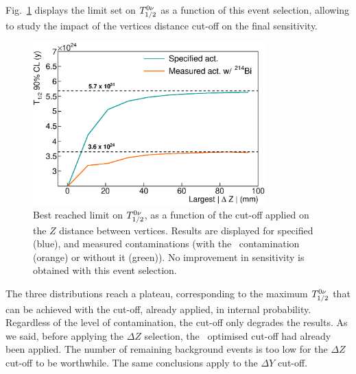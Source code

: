 Fig.~\ref{fig:cont_vertex} displays the limit set on $T_{1/2}^{0\nu}$ as a function of this event selection, allowing to study the impact of the vertices distance cut-off on the final sensitivity.
\begin{figure}[h]
  \centering
  \includegraphics[width=0.8\textwidth]{Sensitivity/fig_sensitivity/contamination_vertex.eps}
  \caption{Best reached limit on $T_{1/2}^{0\nu}$, as a function of the cut-off applied on the $Z$ distance between vertices.
    Results are displayed for specified (blue), and measured contaminations (with the \Bi\ contamination (orange) or without it (green)).
    No improvement in sensitivity is obtained with this event selection.
    \label{fig:cont_vertex}}
\end{figure}
The three distributions reach a plateau, corresponding to the maximum $T_{1/2}^{0\nu}$ that can be achieved with the cut-off, already applied, in internal probability.
Regardless of the level of contamination, the cut-off only degrades the results.
As we said, before applying the $\Delta Z$ selection, the \Pint\ optimised cut-off had already been applied.
The number of remaining background events is too low for the $\Delta Z$ cut-off to be worthwhile.
The same conclusions apply to the $\Delta Y$ cut-off.

